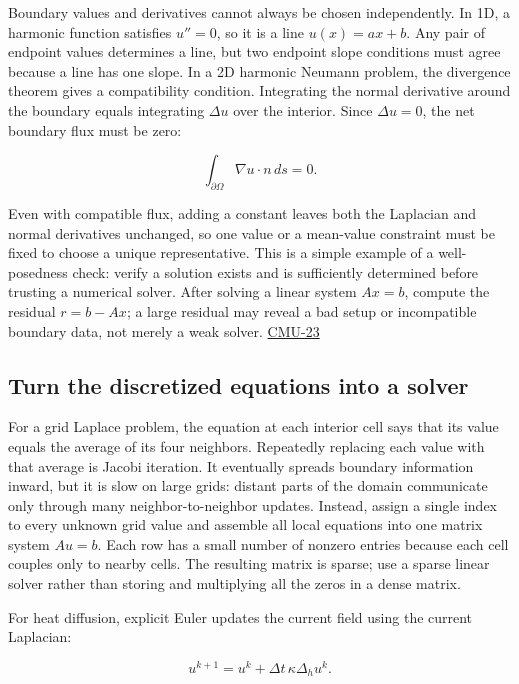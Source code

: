 Boundary values and derivatives cannot always be chosen independently. In 1D, a harmonic function satisfies \(u''=0\), so it is a line \(u(x)=ax+b\). Any pair of endpoint values determines a line, but two endpoint slope conditions must agree because a line has one slope. In a 2D harmonic Neumann problem, the divergence theorem gives a compatibility condition. Integrating the normal derivative around the boundary equals integrating \(\Delta u\) over the interior. Since \(\Delta u=0\), the net boundary flux must be zero:

\[
\int_{\partial\Omega}\nabla u\cdot n\,ds=0.
\]

Even with compatible flux, adding a constant leaves both the Laplacian and normal derivatives unchanged, so one value or a mean-value constraint must be fixed to choose a unique representative. This is a simple example of a well-posedness check: verify a solution exists and is sufficiently determined before trusting a numerical solver. After solving a linear system \(Ax=b\), compute the residual \(r=b-Ax\); a large residual may reveal a bad setup or incompatible boundary data, not merely a weak solver. \hyperref[04-visual-computing-ii-ch036-cmu-23---physically-based-animation-and-pdes]{CMU-23}

\subsection{Turn the discretized equations into a solver}\label{04-visual-computing-ii-ch030-turn-the-discretized-equations-into-a-solver}

For a grid Laplace problem, the equation at each interior cell says that its value equals the average of its four neighbors. Repeatedly replacing each value with that average is Jacobi iteration. It eventually spreads boundary information inward, but it is slow on large grids: distant parts of the domain communicate only through many neighbor-to-neighbor updates. Instead, assign a single index to every unknown grid value and assemble all local equations into one matrix system \(Au=b\). Each row has a small number of nonzero entries because each cell couples only to nearby cells. The resulting matrix is sparse; use a sparse linear solver rather than storing and multiplying all the zeros in a dense matrix.

For heat diffusion, explicit Euler updates the current field using the current Laplacian:

\[
u^{k+1}=u^k+\Delta t\,\kappa\Delta_h u^k.
\]

